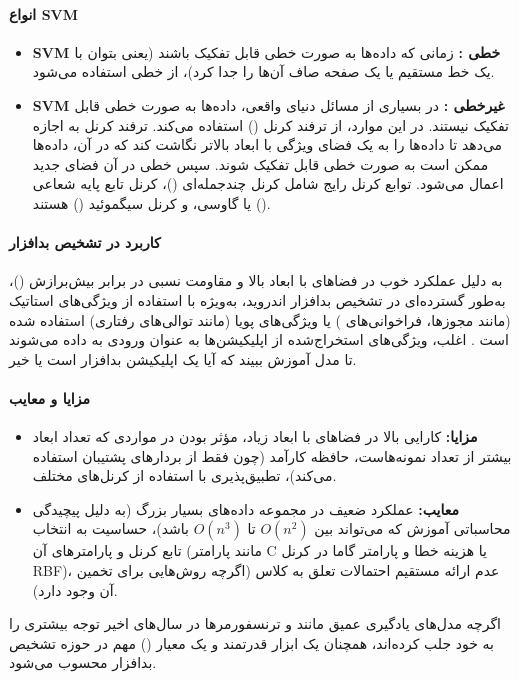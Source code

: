 \paragraph{انواع SVM}
\begin{itemize}
    \item \textbf{SVM خطی :} زمانی که داده‌ها به صورت خطی قابل تفکیک باشند (یعنی بتوان با یک خط مستقیم یا یک صفحه صاف آن‌ها را جدا کرد)، از  خطی استفاده می‌شود.
    \item \textbf{SVM غیرخطی :} در بسیاری از مسائل دنیای واقعی، داده‌ها به صورت خطی قابل تفکیک نیستند. در این موارد،  از ترفند کرنل () استفاده می‌کند. ترفند کرنل به  اجازه می‌دهد تا داده‌ها را به یک فضای ویژگی با ابعاد بالاتر نگاشت کند که در آن، داده‌ها ممکن است به صورت خطی قابل تفکیک شوند. سپس  خطی در آن فضای جدید اعمال می‌شود. توابع کرنل رایج شامل کرنل چندجمله‌ای ()، کرنل تابع پایه شعاعی () یا گاوسی، و کرنل سیگموئید () هستند.
\end{itemize}

\paragraph{کاربرد در تشخیص بدافزار}
 به دلیل عملکرد خوب در فضاهای با ابعاد بالا و مقاومت نسبی در برابر بیش‌برازش ()، به‌طور گسترده‌ای در تشخیص بدافزار اندروید، به‌ویژه با استفاده از ویژگی‌های استاتیک (مانند مجوزها، فراخوانی‌های ) یا ویژگی‌های پویا (مانند توالی‌های رفتاری) استفاده شده است \cite{AndroidMalwareSurvey, Demontis2017}. اغلب، ویژگی‌های استخراج‌شده از اپلیکیشن‌ها به عنوان ورودی به  داده می‌شوند تا مدل آموزش ببیند که آیا یک اپلیکیشن بدافزار است یا خیر.

\paragraph{مزایا و معایب}
\begin{itemize}
    \item \textbf{مزایا:} کارایی بالا در فضاهای با ابعاد زیاد، مؤثر بودن در مواردی که تعداد ابعاد بیشتر از تعداد نمونه‌هاست، حافظه کارآمد (چون فقط از بردارهای پشتیبان استفاده می‌کند)، تطبیق‌پذیری با استفاده از کرنل‌های مختلف.
    \item \textbf{معایب:} عملکرد ضعیف در مجموعه داده‌های بسیار بزرگ (به دلیل پیچیدگی محاسباتی آموزش که می‌تواند بین \(O(n^2)\) تا \(O(n^3)\) باشد)، حساسیت به انتخاب تابع کرنل و پارامترهای آن (مانند پارامتر C یا هزینه خطا و پارامتر گاما در کرنل RBF)، عدم ارائه مستقیم احتمالات تعلق به کلاس (اگرچه روش‌هایی برای تخمین آن وجود دارد).
\end{itemize}
اگرچه مدل‌های یادگیری عمیق مانند  و ترنسفورمرها در سال‌های اخیر توجه بیشتری را به خود جلب کرده‌اند،  همچنان یک ابزار قدرتمند و یک معیار () مهم در حوزه تشخیص بدافزار محسوب می‌شود.

